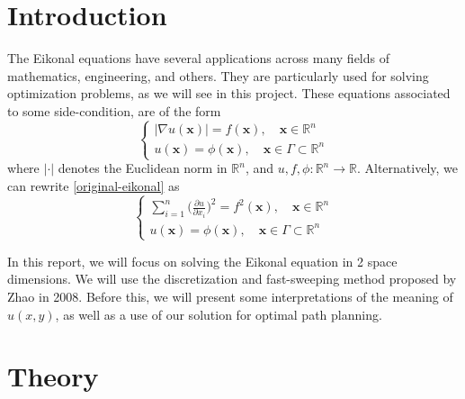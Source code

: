 \documentclass[11pt]{article}
\theoremstyle{definition}
\theoremstyle{remark}
\newcommand{\R}{\mathbb{R}}
\begin{document}
\section{Introduction}
\label{sec:intro}
The Eikonal equations have several applications across many fields of mathematics, engineering, and others. They are particularly used for solving optimization problems, as we will see in this project. These equations associated to some side-condition, are of the form \\
\begin{equation}
\label{original-eikonal}
    \begin{cases}
        |\nabla u(\textbf{x})|=f(\textbf{x}) , \quad\textbf{x} \in\R^n\\
        u(\textbf{x})=\phi(\textbf{x}),\quad \textbf{x} \in \Gamma \subset \R^n
    \end{cases}
\end{equation}
where $|\cdot|$ denotes the Euclidean norm in $\R^n$, and $u,f,\phi:\R^n\xrightarrow{}\R$. Alternatively, we can rewrite \eqref{original-eikonal} as 
\begin{equation}
    \begin{cases}
        \sum_{i=1}^{n}\big(\frac{\partial u}{\partial x_i}\big)^2=f^2(\textbf{x}) , \quad\textbf{x} \in\R^n\\
        u(\textbf{x})=\phi(\textbf{x}),\quad \textbf{x} \in \Gamma \subset \R^n
    \end{cases}
\end{equation}

\noindent In this report, we will focus on solving the Eikonal equation in 2 space dimensions. We will use the discretization and fast-sweeping method proposed by Zhao in 2008. Before this, we will present some interpretations of the meaning of $u(x,y)$, as well as a use of our solution for optimal path planning.

\section{Theory}
\end{document}
